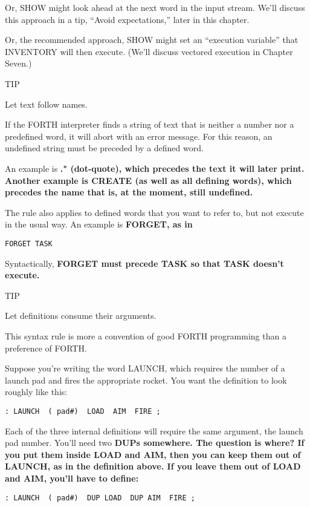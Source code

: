 Or, SHOW might look ahead at the next word in the input stream.
We'll discuss this approach in a tip, ``Avoid expectations,'' later in this
chapter.

Or, the recommended approach, SHOW might set an ``execution
variable'' that INVENTORY will then execute. (We'll discuss vectored
execution in Chapter Seven.)

TIP

Let text follow names.

If the FORTH interpreter finds a string of text that is neither a number
nor a predefined word, it will abort with an error message. For this
reason, an undefined string must be preceded by a defined word.

An example is \bf{."} (dot-quote), which precedes the text it will later
print. Another example is \bf{CREATE} (as well as all defining words), which
precedes the name that is, at the moment, still undefined.

The rule also applies to defined words that you want to refer to, but
not execute in the usual way. An example is \bf{FORGET}, as in

\begin{verbatim}
FORGET TASK
\end{verbatim}

Syntactically, \bf{FORGET} must precede TASK so that TASK doesn't
execute.

TIP

Let definitions consume their arguments.

This syntax rule is more a convention of good FORTH programming
than a preference of FORTH.

Suppose you're writing the word LAUNCH, which requires the
number of a launch pad and fires the appropriate rocket. You want the
definition to look roughly like this:

\begin{verbatim}
: LAUNCH  ( pad#)  LOAD  AIM  FIRE ;
\end{verbatim}

Each of the three internal definitions will require the same argument, the
launch pad number. You'll need two \bf{DUP}s somewhere. The question is
where? If you put them inside LOAD and AIM, then you can keep them
out of LAUNCH, as in the definition above. If you leave them out of
LOAD and AIM, you'll have to define:

\begin{verbatim}
: LAUNCH  ( pad#)  DUP LOAD  DUP AIM  FIRE ;
\end{verbatim}


